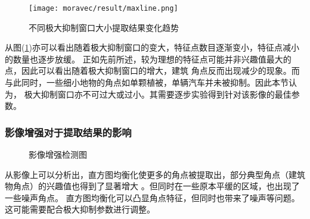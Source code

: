 \begin{enumerate}
            \begin{figure}[H]
                \centering 
                \texttt{[image: moravec/result/maxline.png]}
                \caption{不同极大抑制窗口大小提取结果变化趋势}
                \label{moravec_maxline}
            \end{figure}
            \hspace{20pt}从图(\ref{moravec_maxline})亦可以看出随着极大抑制窗口的变大，特征点数目逐渐变小，特征点减小的数量也逐步放缓。
            正如先前所述，较为理想的特征点可能并非兴趣值最大的点，因此可以看出随着极大抑制窗口的增大，建筑
            角点反而出现减少的现象。而与此同时，一些细小地物的角点如单颗植被，单辆汽车并未被抑制。因此本节认为，
            极大抑制窗口亦不可过大或过小。其需要逐步实验得到针对该影像的最佳参数。
        \end{enumerate}
    
    \subsubsection{影像增强对于提取结果的影响}
    \begin{figure}[H]
        \centering
        \caption{影像增强检测图}
        \label{moravec_enhance}
    \end{figure}
        
    从影像上可以分析出，直方图均衡化使更多的角点被提取出，部分典型角点（建筑物角点）的兴趣值也得到了显著增大
    。但同时在一些原本平缓的区域，也出现了一些噪声角点。
    直方图均衡化可以凸显角点特征，但同时也带来了噪声等问题。这可能需要配合极大抑制参数进行调整。    

